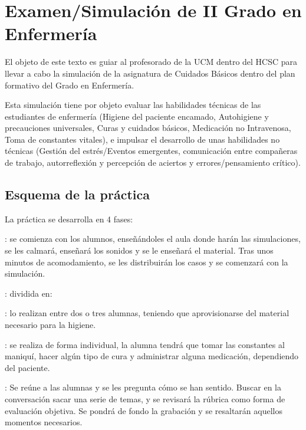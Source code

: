 \section{Examen/Simulación de II Grado en Enfermería}
El objeto de este texto es guiar al profesorado de la UCM dentro del HCSC para llevar a cabo la simulación de la asignatura de Cuidados Básicos dentro del plan formativo del Grado en Enfermería.

Esta simulación tiene por objeto evaluar las habilidades técnicas de las estudiantes de enfermería (Higiene del paciente encamado, Autohigiene y precauciones universales, Curas y cuidados básicos, Medicación no Intravenosa, Toma de constantes vitales), e impulsar el desarrollo de unas habilidades no técnicas (Gestión del estrés/Eventos emergentes, comunicación entre compañeras de trabajo, autorreflexión y percepción de aciertos y errores/pensamiento crítico).

\subsection{Esquema de la práctica}
La práctica se desarrolla en 4 fases:
\begin{description}[topsep=0pt, partopsep=0pt,itemsep=0pt,parsep=0pt]
    \item [Prebriefing]: se comienza con los alumnos, enseñándoles el aula donde harán las simulaciones, se les calmará, enseñará los sonidos y se le enseñará el material. Tras unos minutos de acomodamiento, se les distribuirán los casos y se comenzará con la simulación.
    \item [Simulación]: dividida en:
    \begin{description}[topsep=0pt, partopsep=0pt,itemsep=0pt,parsep=0pt]
        \item [Simulación del paciente encamado]: lo realizan entre dos o tres alumnas, teniendo que aprovisionarse del material necesario para la higiene.
        \item [Simulación de cuidados del paciente]: se realiza de forma individual, la alumna tendrá que tomar las constantes al maniquí, hacer algún tipo de cura y administrar alguna medicación, dependiendo del paciente.
    \end{description}
    \item [Debriefing]: Se reúne a las alumnas y se les pregunta cómo se han sentido. Buscar en la conversación sacar una serie de temas, y se revisará la rúbrica como forma de evaluación objetiva. Se pondrá de fondo la grabación y se resaltarán aquellos momentos necesarios.
\end{description}

